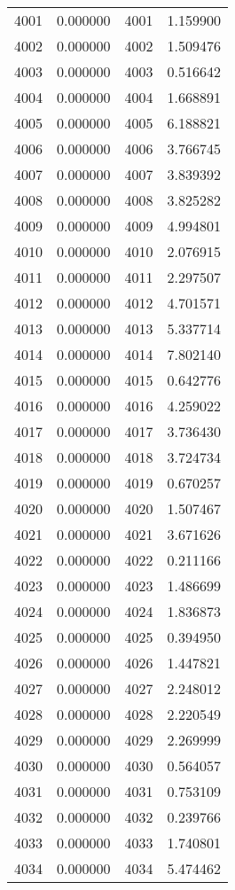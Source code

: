 \documentclass[12pt]{article}
\begin{document}
\begin{longtable}{@{}cccc@{}}
4001 & 0.000000 & 4001 & 1.159900 \\
4002 & 0.000000 & 4002 & 1.509476 \\
4003 & 0.000000 & 4003 & 0.516642 \\
4004 & 0.000000 & 4004 & 1.668891 \\
4005 & 0.000000 & 4005 & 6.188821 \\
4006 & 0.000000 & 4006 & 3.766745 \\
4007 & 0.000000 & 4007 & 3.839392 \\
4008 & 0.000000 & 4008 & 3.825282 \\
4009 & 0.000000 & 4009 & 4.994801 \\
4010 & 0.000000 & 4010 & 2.076915 \\
4011 & 0.000000 & 4011 & 2.297507 \\
4012 & 0.000000 & 4012 & 4.701571 \\
4013 & 0.000000 & 4013 & 5.337714 \\
4014 & 0.000000 & 4014 & 7.802140 \\
4015 & 0.000000 & 4015 & 0.642776 \\
4016 & 0.000000 & 4016 & 4.259022 \\
4017 & 0.000000 & 4017 & 3.736430 \\
4018 & 0.000000 & 4018 & 3.724734 \\
4019 & 0.000000 & 4019 & 0.670257 \\
4020 & 0.000000 & 4020 & 1.507467 \\
4021 & 0.000000 & 4021 & 3.671626 \\
4022 & 0.000000 & 4022 & 0.211166 \\
4023 & 0.000000 & 4023 & 1.486699 \\
4024 & 0.000000 & 4024 & 1.836873 \\
4025 & 0.000000 & 4025 & 0.394950 \\
4026 & 0.000000 & 4026 & 1.447821 \\
4027 & 0.000000 & 4027 & 2.248012 \\
4028 & 0.000000 & 4028 & 2.220549 \\
4029 & 0.000000 & 4029 & 2.269999 \\
4030 & 0.000000 & 4030 & 0.564057 \\
4031 & 0.000000 & 4031 & 0.753109 \\
4032 & 0.000000 & 4032 & 0.239766 \\
4033 & 0.000000 & 4033 & 1.740801 \\
4034 & 0.000000 & 4034 & 5.474462 \\

\end{longtable}
\end{document}
